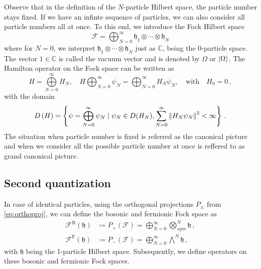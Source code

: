 \documentclass[12pt,a4paper]{article}
\numberwithin{equation}{section}
\newcommand{\1}{\mathbb{I}}
\newcommand{\C}{\mathbb{C}}
\newcommand{\h}{\mathfrak{h}}
\newcommand{\FF}{\mathcal{F}}
\theoremstyle{plain}
\theoremstyle{definition}
\theoremstyle{remark}
\theoremstyle{plain}
\theoremstyle{definition}
\theoremstyle{remark}
\begin{document}
Observe that in the definition of the $N$-particle Hilbert space, the particle number stays fixed. If we have an infinte sequence of particles, we can also consider all particle numbers all at once. To this end, we introduce the Fock Hilbert space
\begin{equation}
	\FF = \bigoplus_{N=0}^{\infty} \h_1\otimes\cdots\otimes\h_N
\end{equation}  
where for $N=0$, we interpret $\h_1\otimes\cdots\otimes\h_N$ just as $\C$, being the 0-particle space. The vector $1 \in \C$ is called the vacuum vector and is denoted by $\Omega$ or $\ket{\Omega}$. The Hamilton operator on the Fock space can be written as
\begin{equation}
 H=\bigoplus\limits_{N=0}^{\infty}H_N,\quad H \bigoplus_{N=0}^{\infty} \psi_N = \bigoplus_{N=0}^{\infty} H_N\psi_N, \quad \text{with}\quad H_0 = 0\,,
\end{equation}
with the domain
\begin{equation}
	D\left(H\right) = \left\{\psi = \bigoplus_{N=0}^{\infty} \psi_N\;|\; \psi_N \in D(H_N), \sum\limits_{N=0}^{\infty} \norm{H_N\psi_N}^2<\infty\right\}\,.
\end{equation}
The situation when particle number is fixed is referred as the canonical picture and when we consider all the possible particle number at once is reffered to as grand canonical picture.
 
\subsection{Second quantization}
In case of identical particles, using the orthogonal projections $P_{\pm}$ from \eqref{eq:orthoproj}, we can define the bosonic and fermionic Fock space as
\begin{align}
	\FF^{\mathrm{B}}(\h) &\coloneq P_{+}(\FF) = \bigoplus_{N=0}^{\infty}\bigotimes^{N}_{sym} \h \,,\\
	\FF^{\mathrm{F}}(\h) &\coloneq P_{-}(\FF) = \bigoplus_{N=0}^{\infty}\bigwedge^{N} \h \,,
\end{align}
with $\h$ being the 1-particle Hilbert space. Subsequently, we define operators on these bosonic and fermionic Fock spaces. 
\end{document}
